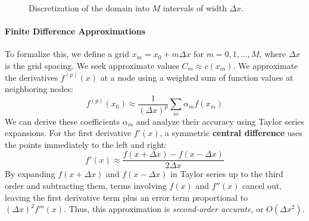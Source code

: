 \begin{figure}[H]
    \centering
    \caption{Discretization of the domain into $M$ intervals of width $\Delta x$.}
    \label{fig:finite_difference_diagram}
\end{figure}


\paragraph*{Finite Difference Approximations}

To formalize this, we define a grid $x_m = x_0 + m\Delta x$ for $m=0, 1, \dots, M$, where $\Delta x$ is the grid spacing. We seek approximate values $C_m \approx c(x_m)$. We approximate the derivatives $f^{(p)}(x)$ at a node using a weighted sum of function values at neighboring nodes:
\begin{equation}
    f^{(p)}(x_0) \approx \frac{1}{(\Delta x)^p} \sum_{m} \alpha_m f(x_m)
\end{equation}
We can derive these coefficients $\alpha_m$ and analyze their accuracy using Taylor series expansions. For the first derivative $f'(x)$, a symmetric \textbf{central difference} uses the points immediately to the left and right:
\begin{equation}
    f'(x) \approx \frac{f(x + \Delta x) - f(x - \Delta x)}{2\Delta x}
\end{equation}
By expanding $f(x+\Delta x)$ and $f(x-\Delta x)$ in Taylor series up to the third order and subtracting them, terms involving $f(x)$ and $f''(x)$ cancel out, leaving the first derivative term plus an error term proportional to $(\Delta x)^2 f'''(x)$. Thus, this approximation is \textit{second-order accurate}, or $O(\Delta x^2)$.

